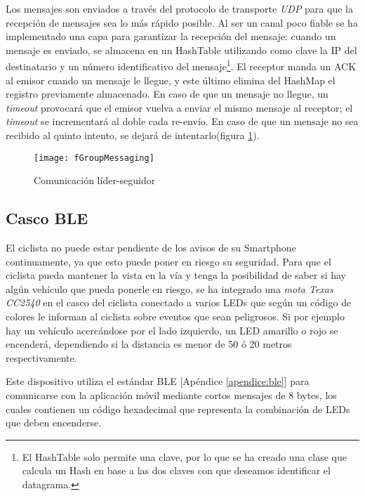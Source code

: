 Los mensajes son enviados a través del protocolo de transporte \emph{UDP} para
que la recepción de mensajes sea lo más rápido posible. Al ser un canal poco
fiable se ha implementado una capa para garantizar la recepción del mensaje:
cuando un mensaje es enviado, se almacena en un HashTable utilizando como clave
la IP del destinatario y un número identificativo del mensaje\footnote{El HashTable
solo permite una clave, por lo que se ha creado una clase que calcula un Hash en
base a las dos claves con que deseamos identificar el datagrama.}. El receptor
manda un ACK al emisor cuando un mensaje le llegue, y este último elimina del
HashMap el registro previamente almacenado. En caso de que un mensaje no llegue,
un \emph{timeout} provocará que el emisor vuelva a enviar el mismo mensaje al
receptor; el \emph{timeout} se incrementará al doble cada re-envío. En caso de
que un mensaje no sea recibido al quinto intento, se dejará de intentarlo(figura
\ref{figure:groupComm}).

\begin{figure}[H]
	\begin{center}
		\texttt{[image: fGroupMessaging]}
		\caption{Comunicación líder-seguidor}
		\label{figure:groupComm}
	\end{center}
\end{figure}

\subsection{Casco BLE}\label{ssection:cascoBLE}
El ciclista no puede estar pendiente de los avisos de su Smartphone continuamente,
ya que esto puede poner en riesgo su seguridad. Para que el ciclista pueda mantener
la vista en la vía y tenga la posibilidad de saber si hay algún vehículo que pueda
ponerle en riesgo, se ha integrado una \emph{mota Texas CC2540} en el casco del
ciclista conectado a varios LEDs que según un código de colores le informan al ciclista
sobre eventos que sean peligrosos. Si por ejemplo hay un vehículo acercándose por
el lado izquierdo, un LED amarillo o rojo se encenderá, dependiendo si la distancia
es menor de 50 ó 20 metros respectivamente.

Este dispositivo utiliza el estándar BLE [Apéndice \ref{apendice:ble}] para comunicarse con la aplicación móvil
mediante cortos mensajes de 8 bytes, los cuales contienen un código hexadecimal que
representa la combinación de LEDs que deben encenderse.

